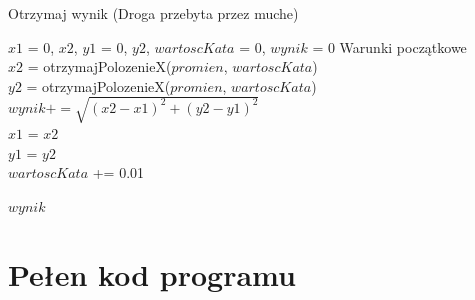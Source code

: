 \documentclass[12pt,a4paper]{article}
\begin{document}
	\BlankLine
	
	\begin{algorithm}[H]
	\caption{Otrzymaj wynik (Droga przebyta przez muche)}
	\BlankLine
	$x1$ = 0, $x2$,
	$y1$ = 0, $y2$,
	$wartoscKata$ = 0, $wynik$ = 0  \Leftarrow Warunki początkowe \\
	 {
		$x2$ = otrzymajPolozenieX($promien$, $wartoscKata$) \\
		$y2$ = otrzymajPolozenieX($promien$, $wartoscKata$) \\
		$wynik += \sqrt{(x2-x1)^2 + (y2-y1)^2}$ \\
		$x1$ = $x2$ \\
		$y1$ = $y2$ \\
		$wartoscKata$ += 0.01 \\
		
	}

	\Return $wynik$
	\end{algorithm}
	\newpage
	\section*{Pełen kod programu}
\end{document}
